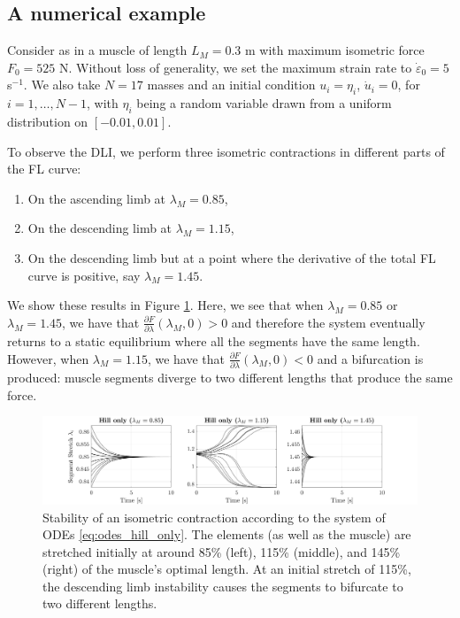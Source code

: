 \documentclass{sfuthesis}
\numberwithin{equation}{section}
\numberwithin{figure}{chapter}
\numberwithin{table}{chapter}
\theoremstyle{definition}
\newcommand{\depsilon}{\dot{\varepsilon}}
\begin{document}
\subsection{A numerical example} \label{sec:stability_numerical_experiment}

Consider as in \cite{YeoEtAl2023NumericalInstability} a muscle of length $L_M = 0.3$ m with maximum isometric force $F_0 = 525 $ N. Without loss of generality, we set the maximum strain rate to $\depsilon_0 = 5$ s$^{-1}$. We also take $N=17$ masses and an initial condition $u_i = \eta_i$, $\dot{u}_i = 0$, for $i=1,\dots,N-1$, with $\eta_i$ being a random variable drawn from a uniform distribution on $[-0.01, 0.01]$.

To observe the DLI, we perform three isometric contractions in different parts of the FL curve:
\begin{enumerate}
    \item On the ascending limb at $\lambda_M = 0.85$,
    \item On the descending limb at $\lambda_M = 1.15$,
    \item On the descending limb but at a point where the derivative of the total FL curve is positive, say $\lambda_M  = 1.45$.
\end{enumerate}
We show these results in Figure \ref{fig:hill_only_unstable}. Here, we see that when $\lambda_M = 0.85$ or $\lambda_M = 1.45$, we have that $\frac{\partial F}{\partial \lambda}(\lambda_M, 0) > 0$ and therefore the system eventually returns to a static equilibrium where all the segments have the same length. However, when $\lambda_M = 1.15$, we have that $\frac{\partial F}{\partial \lambda}(\lambda_M, 0) < 0$ and a bifurcation is produced: muscle segments diverge to two different lengths that produce the same force.

\begin{figure}
    \centering
    \hspace*{-1.9em}\includegraphics[width=1.1\textwidth]{05_no_bm_unstable.png}
    \caption{Stability of an isometric contraction according to the system of ODEs \eqref{eq:odes_hill_only}. The elements (as well as the muscle) are stretched initially at around 85\% (left), 115\% (middle), and 145\% (right) of the muscle's optimal length. At an initial stretch of 115\%, the descending limb instability causes the segments to bifurcate to two different lengths.}
    \label{fig:hill_only_unstable}
\end{figure}
\end{document}

